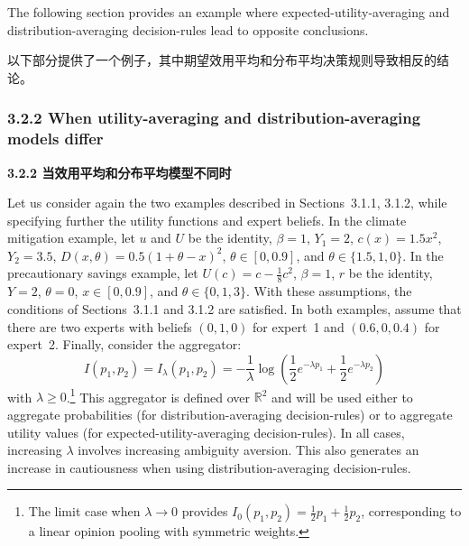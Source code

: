 \documentclass[12pt,a4paper]{article}
\newenvironment{original}
  {\par\noindent\ignorespaces}
  {\par}
\newenvironment{translation}
  {\par\noindent{\color{transblue}\ignorespaces}}
  {\par\medskip}
\newcommand{\R}{\mathbb{R}}
\begin{document}
\begin{original}
The following section provides an example where expected-utility-averaging and distribution-averaging decision-rules lead to opposite conclusions.
\end{original}

\begin{translation}
以下部分提供了一个例子，其中期望效用平均和分布平均决策规则导致相反的结论。
\end{translation}

\subsubsection{3.2.2 When utility-averaging and distribution-averaging models differ}
{\color{transblue}\textbf{3.2.2 当效用平均和分布平均模型不同时}}

\begin{original}
Let us consider again the two examples described in Sections~3.1.1, 3.1.2, while specifying further the utility functions and expert beliefs. In the climate mitigation example, let $u$ and $U$ be the identity, $\beta = 1$, $Y_{1} = 2$, $c(x) = 1.5x^{2}$, $Y_{2} = 3.5$, $D(x, \theta) = 0.5(1 + \theta - x)^{2}$, $\theta \in [0, 0.9]$, and $\theta \in \{1.5, 1, 0\}$. In the precautionary savings example, let $U(c) = c - \frac{1}{8}c^{2}$, $\beta = 1$, $r$ be the identity, $Y = 2$, $\theta = 0$, $x \in [0, 0.9]$, and $\theta \in \{0, 1, 3\}$. With these assumptions, the conditions of Sections~3.1.1 and 3.1.2 are satisfied. In both examples, assume that there are two experts with beliefs $(0, 1, 0)$ for expert~1 and $(0.6, 0, 0.4)$ for expert~2. Finally, consider the aggregator:
\[
I(p_{1}, p_{2}) = I_{\lambda}(p_{1}, p_{2}) = -\frac{1}{\lambda} \log\!\left( \frac{1}{2} e^{-\lambda p_{1}} + \frac{1}{2} e^{-\lambda p_{2}} \right) \tag{11}
\]
with $\lambda \geq 0$.\footnote{The limit case when $\lambda \to 0$ provides $I_{0}(p_{1}, p_{2}) = \frac{1}{2}p_{1} + \frac{1}{2}p_{2}$, corresponding to a linear opinion pooling with symmetric weights.} This aggregator is defined over $\R^{2}$ and will be used either to aggregate probabilities (for distribution-averaging decision-rules) or to aggregate utility values (for expected-utility-averaging decision-rules). In all cases, increasing $\lambda$ involves increasing ambiguity aversion. This also generates an increase in cautiousness when using distribution-averaging decision-rules.
\end{original}
\end{document}
